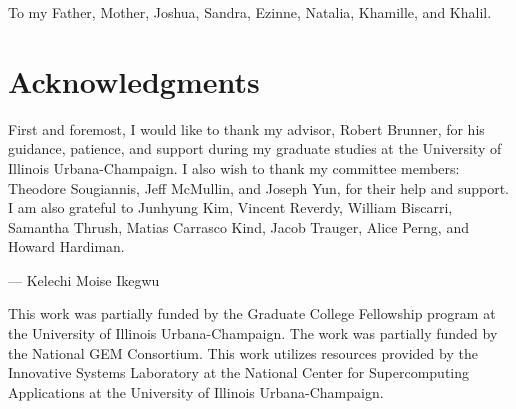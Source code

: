 \documentclass[12pt,edeposit,fullpage]{uiucthesis2014}
\newcommand\RC[1]{\color{red}{\textbf{ Robert Comment: }{#1} }\color{black}}
\begin{document}
\begin{dedication}
To my Father,  Mother,  Joshua,  Sandra,  Ezinne,  Natalia,  Khamille,  and Khalil.
\end{dedication}

\chapter*{Acknowledgments}


First and foremost, I would like to thank my advisor,  Robert Brunner, for his guidance,  patience,  and support during my graduate studies at the University of Illinois Urbana-Champaign.
I also wish to thank my committee members: Theodore Sougiannis, Jeff McMullin, and Joseph Yun,  for their help and support.
I am also grateful to Junhyung Kim, Vincent Reverdy, William Biscarri,  Samantha Thrush,  Matias Carrasco Kind,  Jacob Trauger,  Alice Perng, and Howard Hardiman.

\begin{flushright}
--- Kelechi Moise Ikegwu
\end{flushright}

\vspace{10mm}

This work was partially funded by the Graduate College Fellowship program at the University of Illinois Urbana-Champaign. The work was partially funded by the National GEM Consortium.  This work utilizes resources provided by the Innovative Systems Laboratory at the National Center for Supercomputing Applications at the University of Illinois Urbana-Champaign.

\end{document}
